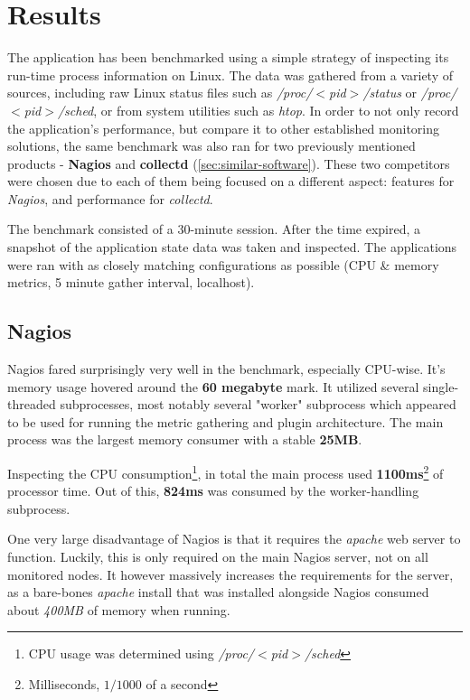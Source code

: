 \section{Results}
    The application has been benchmarked using a simple strategy of inspecting its run-time process information on Linux. The data was gathered from a variety of sources, including raw Linux status files such as \textit{/proc/$<$pid$>$/status} or \textit{/proc/$<$pid$>$/sched}, or from system utilities such as \textit{htop}. In order to not only record the application's performance, but compare it to other established monitoring solutions, the same benchmark was also ran for two previously mentioned products - \textbf{Nagios} and \textbf{collectd} (\autoref{sec:similar-software}). These two competitors were chosen due to each of them being focused on a different aspect: features for \textit{Nagios}, and performance for \textit{collectd}.
    
    The benchmark consisted of a 30-minute session. After the time expired, a snapshot of the application state data was taken and inspected. The applications were ran with as closely matching configurations as possible (CPU \& memory metrics, 5 minute gather interval, localhost).
    
    
    \subsection{Nagios}
        Nagios fared surprisingly very well in the benchmark, especially CPU-wise. It's memory usage hovered around the \textbf{60 megabyte} mark. It utilized several single-threaded subprocesses, most notably several "worker" subprocess which appeared to be used for running the metric gathering and plugin architecture. The main process was the largest memory consumer with a stable \textbf{25MB}. 
        
        Inspecting the CPU consumption\footnote{CPU usage was determined using \textit{/proc/$<$pid$>$/sched}}, in total the main process used \textbf{1100ms}\footnote{Milliseconds, $1/1000$ of a second} of processor time. Out of this, \textbf{824ms} was consumed by the worker-handling subprocess.
        
        One very large disadvantage of Nagios is that it requires the \textit{apache} web server to function. Luckily, this is only required on the main Nagios server, not on all monitored nodes. It however massively increases the requirements for the server, as a bare-bones \textit{apache} install that was installed alongside Nagios consumed about \textit{400MB} of memory when running.
        
